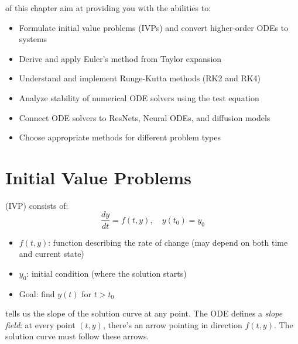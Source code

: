 \vspace{2em}
 of this chapter aim at providing you with the abilities to:
\begin{itemize}
    \item Formulate initial value problems (IVPs) and convert higher-order ODEs to systems
    \item Derive and apply Euler's method from Taylor expansion
    \item Understand and implement Runge-Kutta methods (RK2 and RK4)
    \item Analyze stability of numerical ODE solvers using the test equation
    \item Connect ODE solvers to ResNets, Neural ODEs, and diffusion models
    \item Choose appropriate methods for different problem types
\end{itemize}





\newpage
\section{Initial Value Problems}

 (IVP) consists of:
\begin{equation}
    \boxed{\frac{dy}{dt} = f(t, y), \quad y(t_0) = y_0}
\end{equation}

\begin{itemize}
    \item $f(t, y)$: function describing the rate of change (may depend on both time and current state)
    \item $y_0$: initial condition (where the solution starts)
    \item Goal: find $y(t)$ for $t > t_0$
\end{itemize}


 tells us the slope of the solution curve at any point. The ODE defines a \emph{slope field}: at every point $(t, y)$, there's an arrow pointing in direction $f(t, y)$. The solution curve must follow these arrows.

